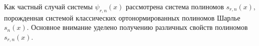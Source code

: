 Как частный случай системы $\mathcal{\psi}_{r,n}(x)$ рассмотрена система полиномов $s_{r,n}(x)$, порожденная системой классических ортонормированных полиномов Шарлье $s_{n}(x)$. Основное внимание уделено получению различных свойств полиномов $s_{r,n}(x)$.
%
%
%
%
%
%
%
